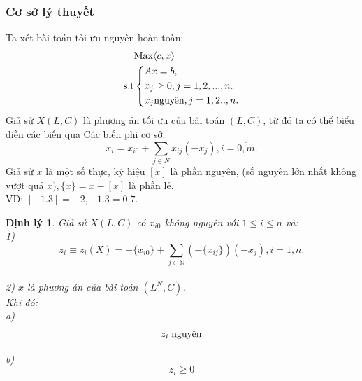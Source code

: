 \documentclass[12pt,a4paper]{report}
\newtheorem{dl}{Định lý}
\begin{document}
\subsubsection{Cơ sở lý thuyết}
Ta xét bài toán tối ưu nguyên hoàn toàn:\\
\begin{equation}\label{Gomory1}
     \begin{split}
          & {\rm{Max}} \langle c,x \rangle\\
          \rm{s.t} &\left\{\begin{split}
            & Ax= b,\\
           & x_j \ge 0, j=1,2,...,n.\\
            & x_j \text{nguyên}, j=1,2..,n.\\
           \end{split}\right.
       \end{split}
   \end{equation}
    Giả sử $X(L,C)$ là phương án  tối ưu của bài toán $(L,C)$, từ đó ta có thể biểu diễn các biến qua Các biến phi cơ sở:\\
   \begin{equation}\label{2.4}
       x_{i}=x_{i0} + \sum_{j \in N} x_{ij}(-x_j), i=\overline{0,m}.
   \end{equation}
    Giả sử $x$ là một số thực, ký hiệu $[x]$ là phần nguyên, (số nguyên lớn nhất không vượt quá $x), \{x\}=x-[x]$ là phần lẻ.\\
    VD: $[-1.3]=-2, {-1.3}=0.7$.\\
    \begin{dl}
        Giả sử $X(L,C)$ có $x_{i0}$ không nguyên với $1\le i\le n$ và:\\
        1)\begin{equation}\label{2.5}
            z_i\equiv z_i(X)= -\{x_{i0}\} + \sum_{j \in \mathbb {N} }(-\{x_{ij}\})(-x_{j}), i=\overline{1,n}.
        \end{equation} \\
        2) $x$ là phương án của bài toán $(L^N,C)$.\\
        Khi đó:\\
        
        a) \begin{equation}\label{2.6}
            z_i \hspace{0.1cm} \text{nguyên}
        \end{equation}
        
        b) \begin{equation}\label{2.7}
            z_i \ge 0
        \end{equation}
        \end{dl}
\end{document}
